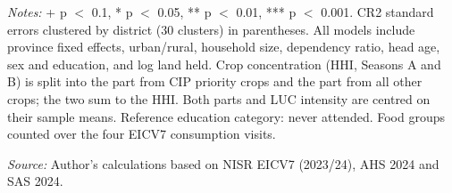 \begin{table}[htbp]
\vspace{0.5em}
\begin{minipage}{\linewidth}
\footnotesize
\textit{Notes:} + p $<$ 0.1, * p $<$ 0.05, ** p $<$ 0.01, *** p $<$ 0.001. CR2 standard errors clustered by district (30 clusters) in parentheses. All models include province fixed effects, urban/rural, household size, dependency ratio, head age, sex and education, and log land held. Crop concentration (HHI, Seasons A and B) is split into the part from CIP priority crops and the part from all other crops; the two sum to the HHI. Both parts and LUC intensity are centred on their sample means. Reference education category: never attended. Food groups counted over the four EICV7 consumption visits.

\textit{Source:} Author's calculations based on NISR EICV7 (2023/24), AHS 2024 and SAS 2024.
\end{minipage}
\end{table}
